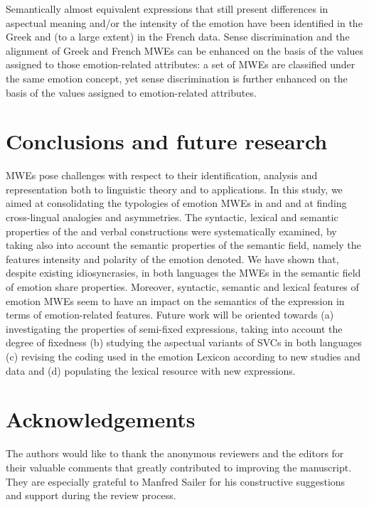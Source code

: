 \documentclass[output=paper]{langsci/langscibook}
\begin{document}
Semantically almost equivalent expressions that still
present differences in aspectual
meaning and/or the intensity of the emotion have been
identified in the Greek and (to a large extent) in the French data. Sense discrimination and the alignment of Greek and French MWEs can be
enhanced on the basis of the values assigned to those emotion-related
attributes: a set of MWEs are classified under the same
emotion concept, yet sense discrimination is further enhanced on the
basis of the values assigned to emotion-related attributes.

\section{Conclusions and future research}


MWEs pose challenges with respect to their identification, analysis and
representation  both to linguistic theory and to applications.  In this study, we aimed at
consolidating the typologies of emotion MWEs in  and  and at
finding cross-lingual analogies and asymmetries. The
syntactic, lexical and semantic properties of the  and  verbal
constructions were systematically examined, by taking also into account
the semantic properties of the semantic field, namely the features
intensity and polarity of the emotion denoted. We have
shown that, despite existing idiosyncrasies, in both languages the MWEs in the semantic
field of emotion share  properties. Moreover,
syntactic, semantic and lexical features of emotion MWEs seem to have
an impact on the semantics of the expression in terms of
emotion-related features. Future work will be oriented towards (a)
investigating the properties of semi-fixed expressions, taking into
account the degree of fixedness (b) studying the aspectual variants of
SVCs in both languages (c) revising the coding used in the emotion
Lexicon according to new studies and data and (d) populating the
lexical resource with new expressions.


\section*{Acknowledgements}

The authors would like to thank the anonymous reviewers and the editors
for their valuable comments that greatly contributed to improving the
manuscript. They are especially grateful to Manfred Sailer for his
constructive suggestions and support during the review process.
\end{document}
